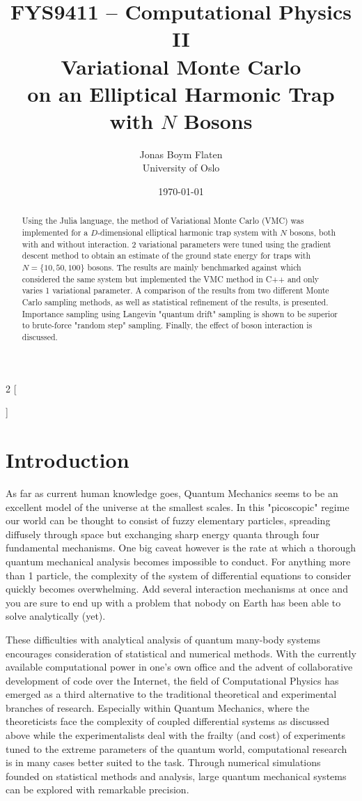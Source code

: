 \documentclass[a4paper,8pt]{article}
\title{\small FYS9411 -- Computational Physics II \\
\Huge Variational Monte Carlo\\\huge on an Elliptical Harmonic Trap with $N$ Bosons}
\author{\large Jonas Boym Flaten \\
\small University of Oslo}
\date{\today}
\begin{document}
\begin{multicols}{2}
[
\maketitle
\begin{abstract}
Using the Julia language, the method of Variational Monte Carlo (VMC) was implemented for a $D$-dimensional elliptical harmonic trap system with $N$ bosons, both with and without interaction. 2 variational parameters were tuned using the gradient descent method to obtain an estimate of the ground state energy for traps with $N = \{10,50,100\}$ bosons. The results are mainly benchmarked against \cite{SWL} which considered the same system but implemented the VMC method in C++ and only varies 1 variational parameter. A comparison of the results from two different Monte Carlo sampling methods, as well as statistical refinement of the results, is presented. Importance sampling using Langevin "quantum drift" sampling is shown to be superior to brute-force "random step" sampling. Finally, the effect of boson interaction is discussed. 
\end{abstract}
]

\section{Introduction}
As far as current human knowledge goes, Quantum Mechanics seems to be an excellent model of the universe at the smallest scales. In this "picoscopic" regime our world can be thought to consist of fuzzy elementary particles, spreading diffusely through space but exchanging sharp energy quanta through four fundamental mechanisms. One big caveat however is the rate at which a thorough quantum mechanical analysis becomes impossible to conduct. For anything more than 1 particle, the complexity of the system of differential equations to consider quickly becomes overwhelming. Add several interaction mechanisms at once and you are sure to end up with a problem that nobody on Earth has been able to solve analytically (yet).

These difficulties with analytical analysis of quantum many-body systems encourages consideration of statistical and numerical methods. With the 
currently available computational power in one's own office and the advent of collaborative development of code over the Internet, the field of Computational Physics has emerged as a third alternative to the traditional theoretical and experimental branches of research. Especially within Quantum Mechanics, where the theoreticists face the complexity of coupled differential systems as discussed above while the experimentalists deal with the frailty (and cost) of experiments tuned to the extreme parameters of the quantum world, computational research is in many cases better suited to the task. Through numerical simulations founded on statistical methods and analysis, large quantum mechanical systems can be explored with remarkable precision.


\end{multicols}
\end{document}
